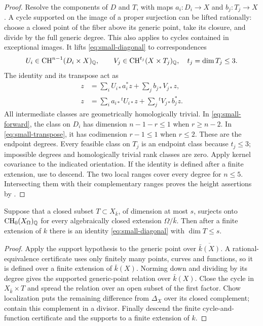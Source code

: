 \begin{proof}
Resolve the components of $D$ and $T$, with maps $a_i:D_i\to X$ and
$b_j:T_j\to X$. A cycle supported on the image of a proper surjection
can be lifted rationally: choose a closed point of the fiber above its
generic point, take its closure, and divide by the full generic
degree. This also applies to cycles contained in exceptional images.
It lifts \eqref{eq:small-diagonal} to correspondences
\[
 U_i\in\operatorname{CH}^{n-1}(D_i\times X)_\mathbb Q,\qquad
 V_j\in\operatorname{CH}^{t_j}(X\times T_j)_\mathbb Q,\quad t_j=\dim T_j\leq3.
\]
The identity and its transpose act as
\begin{align}
 z&=\sum_iU_{i*}a_i^*z+\sum_jb_{j*}V_{j*}z,
       \label{eq:small-forward}\\
 z&=\sum_i a_{i*}{}^tU_{i*}z+\sum_j{}^tV_{j*}b_j^*z.
       \label{eq:small-transpose}
\end{align}
All intermediate classes are geometrically homologically trivial.
In \eqref{eq:small-forward}, the class on $D_i$ has dimension
$n-1-r\leq1$ when $r\geq n-2$. In
\eqref{eq:small-transpose}, it has codimension $r-1\leq1$ when
$r\leq2$. These are the endpoint degrees. Every feasible class on
$T_j$ is an endpoint class because $t_j\leq3$; impossible degrees
and homologically trivial rank classes are zero. Apply kernel
covariance to the indicated orientation. If the identity is defined
after a finite extension, use  to descend.
The two local ranges cover every degree for $n\leq5$. Intersecting
them with their complementary ranges proves the height assertions
by .
\end{proof}

\begin{proposition}\label{prop:universal-support}
Suppose that a closed subset $T\subset X_{\bar k}$, of dimension at
most $s$, surjects onto $\operatorname{CH}_0(X_\Omega)_\mathbb Q$ for every algebraically
closed extension $\Omega/\bar k$. Then after a finite extension of
$k$ there is an identity \eqref{eq:small-diagonal} with $\dim T\leq s$.
\end{proposition}

\begin{proof}
Apply the support hypothesis to the generic point over
$\overline{\bar k(X)}$. A rational-equivalence certificate uses only
finitely many points, curves and functions, so it is defined over a
finite extension of $\bar k(X)$. Norming down and dividing by its
degree gives the supported generic-point relation over $\bar k(X)$.
Close the cycle in $X_{\bar k}\times T$ and spread the relation over
an open subset of the first factor. Chow localization puts the
remaining difference from $\Delta_X$ over its closed complement;
contain this complement in a divisor. Finally descend the finite
cycle-and-function certificate and the supports to a finite
extension of $k$.
\end{proof}


